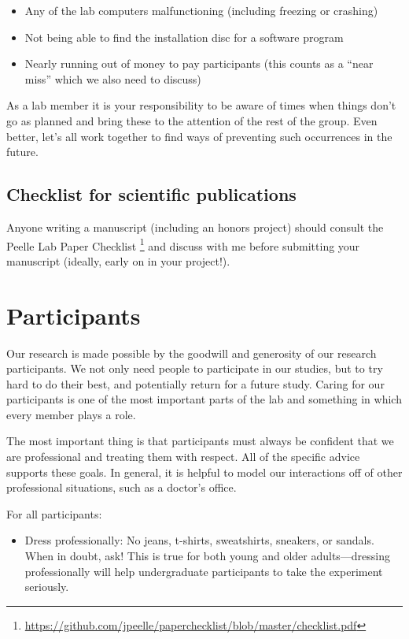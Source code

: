 \documentclass[letterpaper,12pt,oneside]{memoir}
\begin{document}
{\begin{itemize}
\item Any of the lab computers malfunctioning (including freezing or crashing)
\item Not being able to find the installation disc for a software program
\item Nearly running out of money to pay participants (this counts as a ``near miss'' which we also need to discuss)
\end{itemize}

As a lab member it is your responsibility to be aware of times when things don't go as planned and bring these to the attention of the rest of the group. Even better, let's all work together to find ways of preventing such occurrences in the future.


\subsection{Checklist for scientific publications}

Anyone writing a manuscript (including an honors project) should consult the Peelle Lab Paper Checklist \footnote{\url{https://github.com/jpeelle/paperchecklist/blob/master/checklist.pdf}} and discuss with me before submitting your manuscript (ideally, early on in your project!).


\section{Participants}
\label{sec:participants}

Our research is made possible by the goodwill and generosity of our research participants. We not only need people to participate in our studies, but to try hard to do their best, and potentially return for a future study. Caring for our participants is one of the most important parts of the lab and something in which every member plays a role.

The most important thing is that participants must always be confident that we are professional and treating them with respect. All of the specific advice supports these goals. In general, it is helpful to model our interactions off of other professional situations, such as a doctor's office.

For all participants:

\begin{itemize}

\item Dress professionally: No jeans, t-shirts, sweatshirts, sneakers, or sandals. When in doubt, ask! This is true for both young and older adults---dressing professionally will help undergraduate participants to take the experiment seriously.


\end{itemize}}
\end{document}
